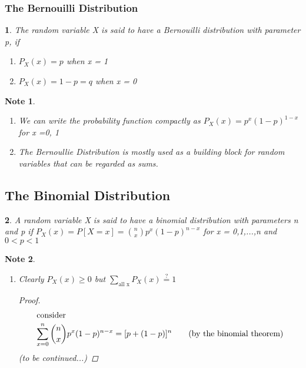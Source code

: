 \documentclass[11pt]{article}
\newtheorem*{note}{Note}
\newtheorem{definition}{\framebox{DEF}}[section]
\newcommand\tab[1][1cm]{\hspace*{#1}}
\begin{document}
            \subsubsection{The Bernouilli Distribution}
                \begin{definition}
                    The random variable X is said to have a Bernouilli distribution with parameter p,
                    if \begin{enumerate}
                        \item $P_X(x) = p$ when x = 1
                        \item $P_X(x) = 1-p = q$ when x = 0 
                    \end{enumerate}
                \end{definition}
                \begin{note} \tab
                    \begin{enumerate}
                        \item We can write the probability function compactly as $P_X(x) = p^x(1-p)^{1-x}$ for x =0, 1
                        \item The Bernoullie Distribution is mostly used as a building block for random variables that can be regarded as sums.
                    \end{enumerate}
                \end{note}

            \subsection{The Binomial Distribution}
                \begin{definition}
                    A random variable X is said to have a binomial distribution with parameters n and p 
                    if $P_X(x) = P[X = x] = \binom{n}{x}p^x(1-p)^{n-x}$ for x = 0,1,...,n and $0 < p < 1$
                \end{definition}

                \begin{note}\tab
                    \begin{enumerate}
                        \item Clearly $P_X(x) \geq 0$ but $\sum\limits_{\text{all x}} P_X(x) \stackrel{?}{=} 1$ 
                                \begin{proof}
                                    \begin{align*}
                                        \intertext{consider} 
                                        \sum_{x=0}^n \binom{n}{x}p^x(1-p)^{n-x} &= [p + (1-p)]^n \tag{by the binomial theorem}\\
                                    \end{align*}
                                    (to be continued...)
                                \end{proof}
                    \end{enumerate}
                \end{note}
                \newpage
\end{document}
